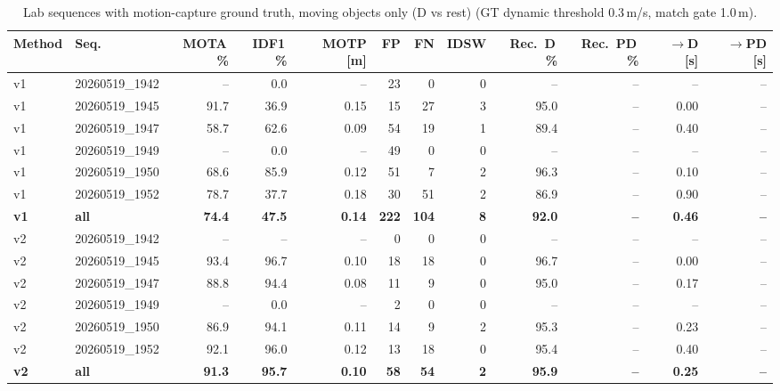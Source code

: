 \begin{table}[t]
\centering
\caption{Lab sequences with motion-capture ground truth, moving objects only (D vs rest) (GT dynamic threshold 0.3\,m/s, match gate 1.0\,m).}
\label{tab:own_r9b_dynamic_only}
\setlength{\tabcolsep}{3pt}
\begin{tabular}{llrrrrrrrrrr}
\toprule
Method & Seq. & MOTA\,\% & IDF1\,\% & MOTP [m] & FP & FN & IDSW & Rec.\ D\,\% & Rec.\ PD\,\% & $\to$D [s] & $\to$PD [s] \\
\midrule
v1 & 20260519\_1942 & -- & 0.0 & -- & 23 & 0 & 0 & -- & -- & -- & -- \\
v1 & 20260519\_1945 & 91.7 & 36.9 & 0.15 & 15 & 27 & 3 & 95.0 & -- & 0.00 & -- \\
v1 & 20260519\_1947 & 58.7 & 62.6 & 0.09 & 54 & 19 & 1 & 89.4 & -- & 0.40 & -- \\
v1 & 20260519\_1949 & -- & 0.0 & -- & 49 & 0 & 0 & -- & -- & -- & -- \\
v1 & 20260519\_1950 & 68.6 & 85.9 & 0.12 & 51 & 7 & 2 & 96.3 & -- & 0.10 & -- \\
v1 & 20260519\_1952 & 78.7 & 37.7 & 0.18 & 30 & 51 & 2 & 86.9 & -- & 0.90 & -- \\
\textbf{v1} & \textbf{all} & \textbf{74.4} & \textbf{47.5} & \textbf{0.14} & \textbf{222} & \textbf{104} & \textbf{8} & \textbf{92.0} & \textbf{--} & \textbf{0.46} & \textbf{--} \\
\midrule
v2 & 20260519\_1942 & -- & -- & -- & 0 & 0 & 0 & -- & -- & -- & -- \\
v2 & 20260519\_1945 & 93.4 & 96.7 & 0.10 & 18 & 18 & 0 & 96.7 & -- & 0.00 & -- \\
v2 & 20260519\_1947 & 88.8 & 94.4 & 0.08 & 11 & 9 & 0 & 95.0 & -- & 0.17 & -- \\
v2 & 20260519\_1949 & -- & 0.0 & -- & 2 & 0 & 0 & -- & -- & -- & -- \\
v2 & 20260519\_1950 & 86.9 & 94.1 & 0.11 & 14 & 9 & 2 & 95.3 & -- & 0.23 & -- \\
v2 & 20260519\_1952 & 92.1 & 96.0 & 0.12 & 13 & 18 & 0 & 95.4 & -- & 0.40 & -- \\
\textbf{v2} & \textbf{all} & \textbf{91.3} & \textbf{95.7} & \textbf{0.10} & \textbf{58} & \textbf{54} & \textbf{2} & \textbf{95.9} & \textbf{--} & \textbf{0.25} & \textbf{--} \\
\bottomrule
\end{tabular}
\end{table}
